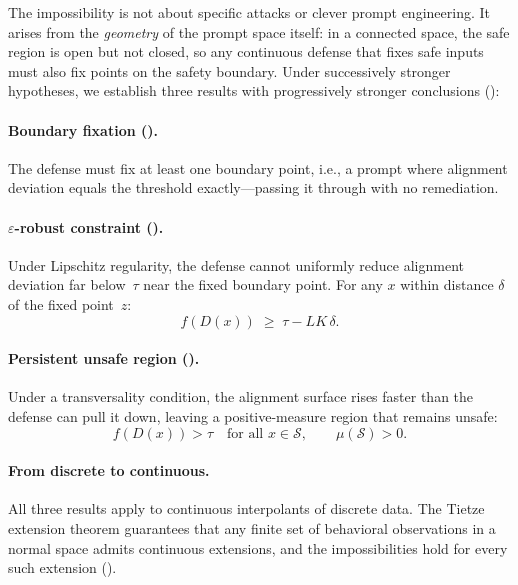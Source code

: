 \documentclass[11pt]{article}
\begin{document}
The impossibility is not about specific attacks or clever prompt
engineering. It arises from the \emph{geometry} of the prompt space
itself: in a connected space, the safe region is open but not closed,
so any continuous defense that fixes safe inputs must also fix points
on the safety boundary. Under successively stronger hypotheses,
we establish three results with progressively stronger conclusions
():

\paragraph{Boundary fixation ().}
The defense must fix at least one boundary point, i.e., a prompt where
alignment deviation equals the threshold exactly---passing it through
with no remediation.

\paragraph{$\varepsilon$-robust constraint ().}
Under Lipschitz regularity, the defense cannot uniformly reduce
alignment deviation far below~$\tau$ near the fixed boundary point.
For any $x$ within distance $\delta$ of the fixed point~$z$:
\begin{equation}
  f(D(x)) \;\geq\; \tau - LK\,\delta.
\end{equation}

\paragraph{Persistent unsafe region ().}
Under a transversality condition, the alignment surface rises faster
than the defense can pull it down, leaving a positive-measure region
that remains unsafe:
\begin{equation}
  f(D(x)) > \tau \quad\text{for all } x \in \mathcal{S},
  \qquad \mu(\mathcal{S}) > 0.
\end{equation}

\paragraph{From discrete to continuous.}
All three results apply to continuous interpolants of discrete data.
The Tietze extension theorem guarantees that any finite set of
behavioral observations in a normal space admits continuous extensions,
and the impossibilities hold for every such extension
().
\end{document}
